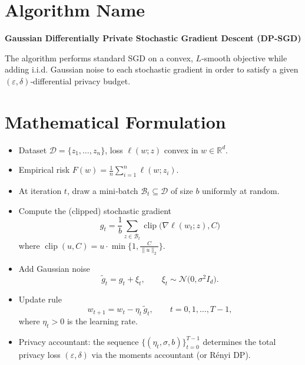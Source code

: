 \documentclass{article}
\begin{document}
\section*{Algorithm Name}
\textbf{Gaussian Differentially Private Stochastic Gradient Descent (DP‑SGD)}  

The algorithm performs standard SGD on a convex, $L$‑smooth objective while adding i.i.d. Gaussian noise to each stochastic gradient in order to satisfy a given $(\varepsilon,\delta)$‑differential privacy budget.

\section*{Mathematical Formulation}
\begin{itemize}
    \item Dataset $\mathcal{D}=\{z_{1},\dots ,z_{n}\}$, loss $\ell(w;z)$ convex in $w\in\mathbb{R}^{d}$.
    \item Empirical risk $F(w)=\frac{1}{n}\sum_{i=1}^{n}\ell(w;z_{i})$.
    \item At iteration $t$, draw a mini‑batch $\mathcal{B}_{t}\subseteq\mathcal{D}$ of size $b$ uniformly at random.
    \item Compute the (clipped) stochastic gradient
          \[
          g_{t}= \frac{1}{b}\sum_{z\in\mathcal{B}_{t}}\operatorname{clip}\bigl(\nabla\ell(w_{t};z),C\bigr)
          \]
          where $\operatorname{clip}(u,C)=u\cdot\min\{1,\tfrac{C}{\|u\|_{2}}\}$.
    \item Add Gaussian noise
          \[
          \tilde g_{t}= g_{t}+ \xi_{t},\qquad \xi_{t}\sim\mathcal{N}\!\bigl(0,\sigma^{2}I_{d}\bigr).
          \]
    \item Update rule
          \[
          w_{t+1}= w_{t}-\eta_{t}\,\tilde g_{t},
          \qquad t=0,1,\dots ,T-1,
          \]
          where $\eta_{t}>0$ is the learning rate.
    \item Privacy accountant: the sequence $\{(\eta_{t},\sigma,b)\}_{t=0}^{T-1}$ determines the total privacy loss
          $(\varepsilon,\delta)$ via the moments accountant (or Rényi DP).  
\end{itemize}
\end{document}
